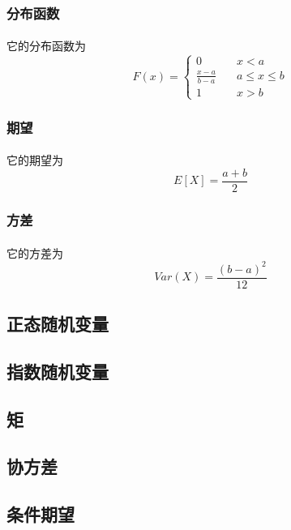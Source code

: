 \subsubsection{分布函数}
\paragraph{}
它的分布函数为
$$
F(x) = \begin{cases}
0 & \quad x <  a \\
\frac{x-a}{b-a} & \quad a  \leq x  \leq b \\
1 & \quad x > b
\end{cases}
$$

\subsubsection{期望}
\paragraph{}
它的期望为
$$
E[X] = \frac{a+b}{2}
$$

\subsubsection{方差}
\paragraph{}
它的方差为
$$
Var(X) = \frac{(b-a)^2}{12}
$$

\subsection{正态随机变量}


\subsection{指数随机变量}


\subsection{矩}


\subsection{协方差}

\subsection{条件期望}
